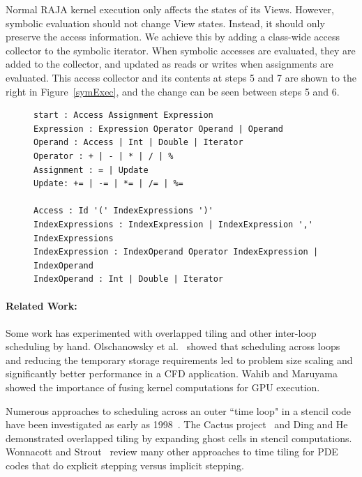 \documentclass{article}
\begin{document}
Normal RAJA kernel execution only affects the states of its Views. 
However, symbolic evaluation should not change View states. 
Instead, it should only preserve the access information.
We achieve this by adding a class-wide access collector to the symbolic iterator. 
When symbolic accesses are evaluated, they are added to the collector, and updated as reads or writes when assignments are evaluated.
This access collector and its contents at steps 5 and 7 are shown to the right in Figure~\ref{symExec}, and the change can be seen between steps 5 and 6.
 
\begin{figure}[t]
\begin{lstlisting}[label={ExpressionGrammar},caption={EBNF Grammar to Support Symbolic Evaluation}]
start : Access Assignment Expression
Expression : Expression Operator Operand | Operand
Operand : Access | Int | Double | Iterator
Operator : + | - | * | / | %
Assignment : = | Update
Update: += | -= | *= | /= | %=

Access : Id '(' IndexExpressions ')'
IndexExpressions : IndexExpression | IndexExpression ',' IndexExpressions
IndexExpression : IndexOperand Operator IndexExpression | IndexOperand
IndexOperand : Int | Double | Iterator
\end{lstlisting}
\end{figure}

\paragraph{Related Work:}

Some work has experimented with overlapped tiling and other inter-loop
scheduling by hand.
Olschanowsky et al.~\cite{CathieSC14} showed that scheduling across loops and
reducing the temporary storage requirements led to problem size scaling and
significantly better performance in a CFD application.
Wahib and Maruyama~\cite{Wahib14} showed the importance of fusing kernel
computations for GPU execution.

Numerous approaches to scheduling across an outer ``time loop" in a stencil
code have been investigated as early as 1998~\cite{Bassetti98,Wonnacott00}.  
The Cactus project~\cite{Ripeanu2001,Allen00cactus-gtoolkit} and 
Ding and He~\cite{Ding2001} demonstrated  overlapped tiling by expanding
ghost cells in stencil computations. 
Wonnacott and Strout~\cite{Wonnacott13} review many other approaches to
time tiling for PDE codes that do explicit stepping versus implicit stepping.
\end{document}
